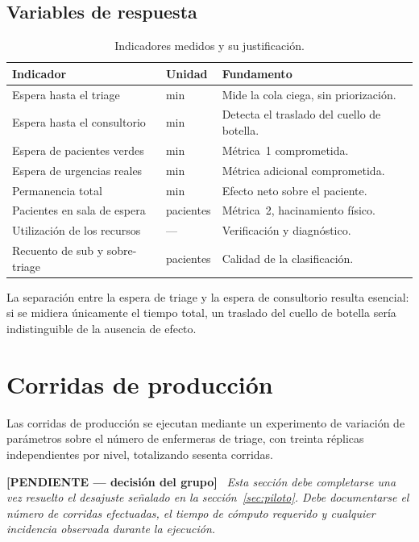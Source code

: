 \documentclass{article}
\newenvironment{pendiente}
  {\par\medskip\noindent\begingroup\color{red!65!black}%
   \textbf{[PENDIENTE — decisión del grupo]}\ \itshape}
  {\endgroup\par\medskip}
\begin{document}
\subsection{Variables de respuesta}

\begin{table}[H]
\centering
\small
\begin{tabular}{llp{6.2cm}}
\toprule
\textbf{Indicador} & \textbf{Unidad} & \textbf{Fundamento} \\
\midrule
Espera hasta el triage & min & Mide la cola ciega, sin priorización. \\
Espera hasta el consultorio & min & Detecta el traslado del cuello de botella. \\
Espera de pacientes verdes & min & Métrica~1 comprometida. \\
Espera de urgencias reales & min & Métrica adicional comprometida. \\
Permanencia total & min & Efecto neto sobre el paciente. \\
Pacientes en sala de espera & pacientes & Métrica~2, hacinamiento físico. \\
Utilización de los recursos & --- & Verificación y diagnóstico. \\
Recuento de sub y sobre-triage & pacientes & Calidad de la clasificación. \\
\bottomrule
\end{tabular}
\caption{Indicadores medidos y su justificación.}
\end{table}

La separación entre la espera de triage y la espera de consultorio resulta
esencial: si se midiera únicamente el tiempo total, un traslado del cuello de
botella sería indistinguible de la ausencia de efecto.

\section{Corridas de producción}

Las corridas de producción se ejecutan mediante un experimento de variación
de parámetros sobre el número de enfermeras de triage, con treinta réplicas
independientes por nivel, totalizando sesenta corridas.

\begin{pendiente}
Esta sección debe completarse una vez resuelto el desajuste señalado en la
sección~\ref{sec:piloto}. Debe documentarse el número de corridas efectuadas,
el tiempo de cómputo requerido y cualquier incidencia observada durante la
ejecución.
\end{pendiente}
\end{document}
